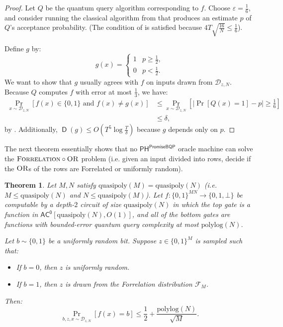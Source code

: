 \documentclass[10pt,a4paper]{article}
\newtheorem{theorem}{Theorem}
\newcommand{\eps}{\varepsilon}
\newcommand{\polylog}{\mathrm{polylog}}
\newcommand{\quasipoly}{\mathrm{quasipoly}}
\newcommand{\OR}{\normalfont\textsc{OR}}
\newcommand{\Forrelation}{\normalfont\textsc{Forrelation}}
\DeclareMathOperator{\D}{\mathsf{D}}
\begin{document}
\begin{proof}
Let $Q$ be the quantum query algorithm corresponding to $f$. Choose $\eps = \frac{1}{6}$, and consider running the classical algorithm from  that produces an estimate $p$ of $Q$'s acceptance probability. (The condition of  is satisfied because $4T\sqrt{\frac{16}{N}} \le \frac{1}{6}$).

Define $g$ by:
\[
g(x) = \begin{cases}
1 & p \ge \frac{1}{2},\\
0 & p < \frac{1}{2}.
\end{cases}
\]
We want to show that $g$ usually agrees with $f$ on inputs drawn from $\mathcal{D}_{z,N}$. Because $Q$ computes $f$ with error at most $\frac{1}{3}$, we have:
\begin{align*}
\Pr_{x \sim \mathcal{D}_{z,N}}\left[f(x) \in \{0,1\} \text{ and } f(x) \neq g(x)\right] &\le \Pr_{x \sim \mathcal{D}_{z,N}}\left[|\Pr[Q(x) = 1] - p| \ge \frac{1}{6} \right]\\
&\le \delta,
\end{align*}
by . Additionally, $\D(g) \le O\left(T^5 \log \frac{T}{\delta}\right)$ because $g$ depends only on $p$.
\end{proof}

The next theorem essentially shows that no $\mathsf{PH}^\mathsf{PromiseBQP}$ oracle machine can solve the $\Forrelation \circ \OR$ problem (i.e. given an input divided into rows, decide if the $\OR$s of the rows are Forrelated or uniformly random).

\begin{theorem}
\label{thm:ph^bqp_forrelation_of_ors}
Let $M, N$ satisfy $\quasipoly(M) = \quasipoly(N)$ (i.e. $M \le \quasipoly(N)$ and $N \le \quasipoly(M)$). Let $f: \{0,1\}^{MN} \to \{0,1,\bot\}$ be computable by a depth-$2$ circuit of size $\quasipoly(N)$ in which the top gate is a function in $\mathsf{AC^0}[\quasipoly(N), O(1)]$, and all of the bottom gates are functions with bounded-error quantum query complexity at most $\polylog(N)$.

Let $b \sim \{0,1\}$ be a uniformly random bit. Suppose $z \in \{0,1\}^{M}$ is sampled such that:
\begin{itemize}
\item If $b = 0$, then $z$ is uniformly random.
\item If $b = 1$, then $z$ is drawn from the Forrelation distribution $\mathcal{F}_M$.
\end{itemize}
Then:
\[
\Pr_{b,z,x \sim \mathcal{D}_{z,N}} \left[f(x) = b \right] \le \frac{1}{2} + \frac{\polylog(N)}{\sqrt{M}}.
\]
\end{theorem}
\end{document}
